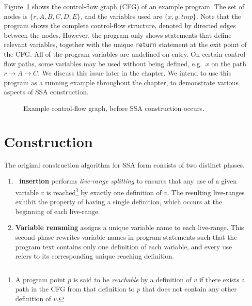 {Figure~\ref{fig:classical_construction_algorithm:examplecfg}
shows the control-flow graph (CFG) of an example
program. The set of nodes is $\{ r, A, B, C, D, E\}$, and
the variables used are $\{ x, y, \textit{tmp} \}$.
Note that the program shows the complete control-flow structure,
denoted by directed edges between the nodes.
However, the program only shows 
statements that define relevant variables, together with the
unique \texttt{return} statement at the exit point of the CFG.
All of the program variables are undefined on entry. On certain
control-flow paths, some variables may be used without being defined, 
e.g.\ $x$ on the path $r \rightarrow A \rightarrow C$. 
We discuss this issue later in the chapter.
We intend to use this program as a running example
throughout the chapter,
to demonstrate various aspects of SSA construction.


\begin{figure}
  \begin{center}
  \end{center}
\caption{\label{fig:classical_construction_algorithm:examplecfg}Example control-flow graph, before
  SSA construction occurs.}
\end{figure}

\section{Construction}
\label{sec:classical_construction}

The original construction algorithm for SSA form 
consists of two distinct phases.
\begin{enumerate}
\item \textbf{\phifun\ insertion} performs \textit{live-range splitting} to ensures that any use of a given variable $v$ is reached\footnote{A program point $p$ is said to be \emph{reachable} by a definition of $v$ if there exists a path in the CFG from that definition to $p$ that does not contain any other definition of $v$.}  by exactly one definition of $v$. 
The resulting live-ranges exhibit the property of having a single definition, which occurs at the beginning of each live-range.
\item \textbf{Variable renaming} assigns a unique variable name to each live-range. This second phase rewrites variable names in program statements such that the program text contains only one definition of each variable, and every use refers to its corresponding unique reaching definition.
\end{enumerate}

}
